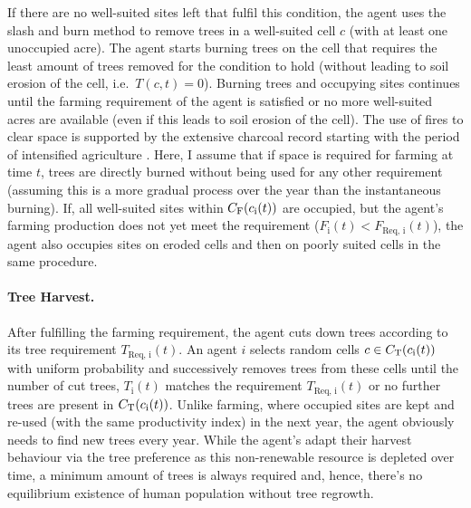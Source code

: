 If there are no well-suited sites left that fulfil this condition, the agent uses the slash and burn method to remove trees in a well-suited cell $c$ (with at least one unoccupied acre).
The agent starts burning trees on the cell that requires the least amount of trees removed for the condition to hold (without leading to soil erosion of the cell, i.e.\ $T(c,t)=0$).
Burning trees and occupying sites continues until the farming requirement of the agent is satisfied or no more well-suited acres are available (even if this leads to soil erosion of the cell).
The use of fires to clear space is supported by the extensive charcoal record starting with the period of intensified agriculture \citep{Mieth2015}. 
Here, I assume that if space is required for farming at time $t$, 
trees are directly burned without being used for any other requirement (assuming this is a more gradual process over the year than the instantaneous burning).
If, all well-suited sites within $C_{\rm F}(c_{\rm i}(t))$ are occupied, but the agent's farming production does not yet meet the requirement ($F_\text{i}(t)<F_\text{Req, i}(t)$), the agent also occupies sites on eroded cells and then on poorly suited cells in the same procedure.

\paragraph{Tree Harvest.}
After fulfilling the farming requirement, the agent cuts down trees according to its tree requirement $T_\text{Req, i}(t)$.
An agent $i$ selects random cells $c\in C_{\rm T}(c_{\rm i}(t))$ with uniform probability and successively removes trees from these cells until the number of cut trees, $T_\text{i}(t)$ matches the requirement $T_\text{Req, i}(t)$ or no further trees are present in $ C_{\rm T}(c_{\rm i}(t))$. 
Unlike farming, where occupied sites are kept and re-used (with the same productivity index) in the next year, the agent obviously needs to find new trees every year.
While the agent's adapt their harvest behaviour via the tree preference as this non-renewable resource is depleted over time, a minimum amount of trees is always required and, hence, there's no equilibrium existence of human population without tree regrowth.

